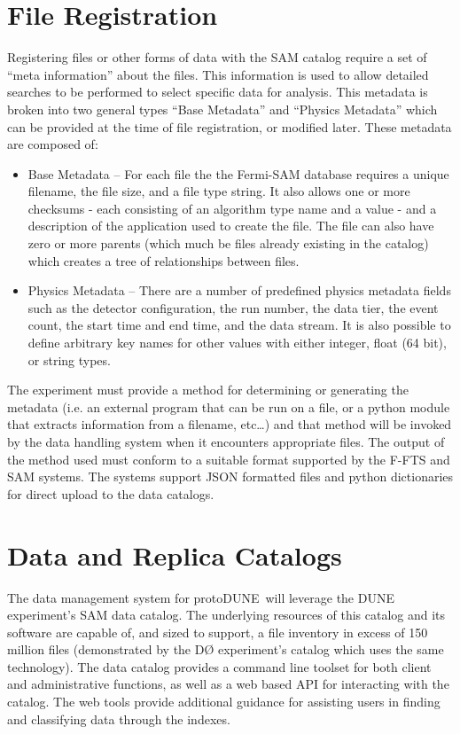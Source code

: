 \documentclass[pdftex,12pt,letter]{article}
\newcommand{\pd}{protoDUNE\ }
\begin{document}
\section{File Registration}

Registering files or other forms of data with the SAM catalog require a set of “meta information” about the files.  This information is used to allow detailed searches to be performed to select specific data for analysis.  This metadata is broken into two general types “Base Metadata” and “Physics Metadata” which can be provided at the time of file registration, or modified later.  These metadata are composed of:
\begin{itemize}
\item Base Metadata -- For each file the the Fermi-SAM database requires a unique filename, the file size, and a file type string. It also allows one or more checksums - each consisting of an algorithm type name and a value - and a description of the application used to create the file. The file can also have zero or more parents (which much be files already existing in the catalog) which creates a tree of relationships between files.
\item Physics Metadata -- There are a number of predefined physics metadata fields such as the detector configuration, the run number, the data tier, the event count, the start time and end time, and the data stream. It is also possible to define arbitrary key names for other values with either integer, float (64 bit), or string types.
\end{itemize}

The experiment must provide a method for determining or generating the metadata (i.e. an external program that can be run on a file, or a python module that extracts information from a filename, etc…)  and that method will be invoked by the data handling system when it encounters appropriate files.  The output of the method used must conform to a suitable format supported by the F-FTS and SAM systems.  The systems support JSON formatted files and python dictionaries for direct upload to the data catalogs.  

\section{Data and Replica Catalogs}

The data management system for \pd will leverage the DUNE experiment’s SAM data catalog.  The underlying resources of this catalog and its software are capable of, and sized to support, a file inventory in excess of 150 million files (demonstrated by the DØ experiment’s catalog which uses the same technology).  The data catalog provides a command line toolset for both client and administrative functions, as well as a web based API for interacting with the catalog.  The web tools provide additional guidance for assisting users in finding and classifying data through the indexes.
\end{document}
